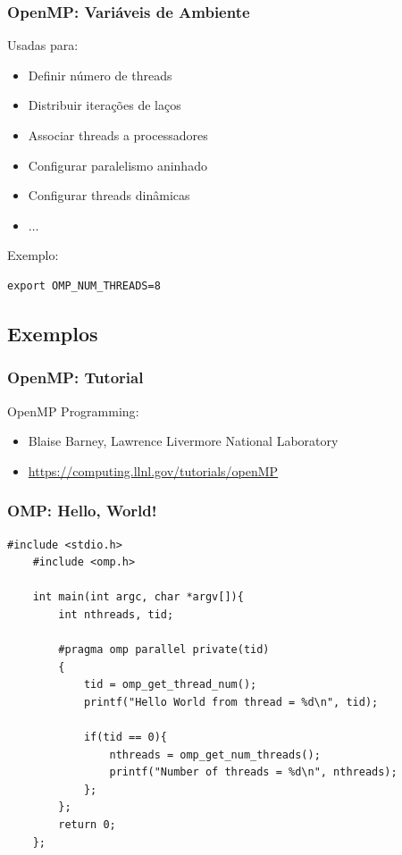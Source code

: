 \documentclass[10pt, compress]{beamer}
\begin{document}
\begin{frame}[fragile]
    \frametitle{OpenMP: Variáveis de Ambiente}
    Usadas para:
    \begin{itemize}
        \item Definir \alert{número de threads}
        \item Distribuir \alert{iterações de laços}
        \item Associar \alert{threads a processadores}
        \item Configurar \alert{paralelismo aninhado}
        \item Configurar \alert{threads dinâmicas}
        \item $\dots$
    \end{itemize}

    Exemplo:
    \begin{lstlisting}[basicstyle=\ttfamily\scriptsize]
        export OMP_NUM_THREADS=8
    \end{lstlisting}
\end{frame}

\subsection{Exemplos}

\begin{frame}
    \frametitle{OpenMP: Tutorial}
    \alert{OpenMP Programming}:
    \begin{itemize}
        \item Blaise Barney, Lawrence Livermore National Laboratory
        \item \url{https://computing.llnl.gov/tutorials/openMP}
    \end{itemize}
\end{frame}

\begin{frame}[fragile]
    \frametitle{OMP: Hello, World!}
    \begin{lstlisting}[basicstyle=\ttfamily\scriptsize]
    #include <stdio.h>
    #include <omp.h>

    int main(int argc, char *argv[]){
        int nthreads, tid;

        #pragma omp parallel private(tid)
        {
            tid = omp_get_thread_num();
            printf("Hello World from thread = %d\n", tid);

            if(tid == 0){
                nthreads = omp_get_num_threads();
                printf("Number of threads = %d\n", nthreads);
            };
        };
        return 0;
    };
    \end{lstlisting}
\end{frame}
\end{document}
